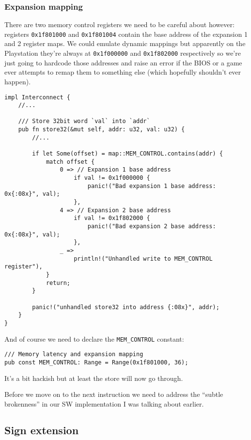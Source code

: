 \documentclass[a4paper]{article}
\newcommand{\code}[1] {\texttt{#1}}
\begin{document}
\subsubsection{Expansion mapping}

There are two memory control registers we need to be careful about
however: registers \code{0x1f801000} and \code{0x1f801004} contain
the base address of the expansion 1 and 2 register maps. We could
emulate dynamic mappings but apparently on the Playstation they're
always at \code{0x1f000000} and \code{0x1f802000} respectively so
we're just going to hardcode those addresses and raise an error if the
BIOS or a game ever attempts to remap them to something else (which
hopefully shouldn't ever happen).

\begin{lstlisting}
impl Interconnect {
    //...

    /// Store 32bit word `val` into `addr`
    pub fn store32(&mut self, addr: u32, val: u32) {
        //...

        if let Some(offset) = map::MEM_CONTROL.contains(addr) {
            match offset {
                0 => // Expansion 1 base address
                    if val != 0x1f000000 {
                        panic!("Bad expansion 1 base address: 0x{:08x}", val);
                    },
                4 => // Expansion 2 base address
                    if val != 0x1f802000 {
                        panic!("Bad expansion 2 base address: 0x{:08x}", val);
                    },
                _ =>
                    println!("Unhandled write to MEM_CONTROL register"),
            }
            return;
        }

        panic!("unhandled store32 into address {:08x}", addr);
    }
}
\end{lstlisting}

And of course we need to declare the \code{MEM\_CONTROL} constant:

\begin{lstlisting}
/// Memory latency and expansion mapping
pub const MEM_CONTROL: Range = Range(0x1f801000, 36);
\end{lstlisting}

It's a bit hackish but at least the store will now go through.

Before we move on to the next instruction we need to address the
``subtle brokenness'' in our SW implementation I was talking about
earlier.

\subsection{Sign extension}
\end{document}
